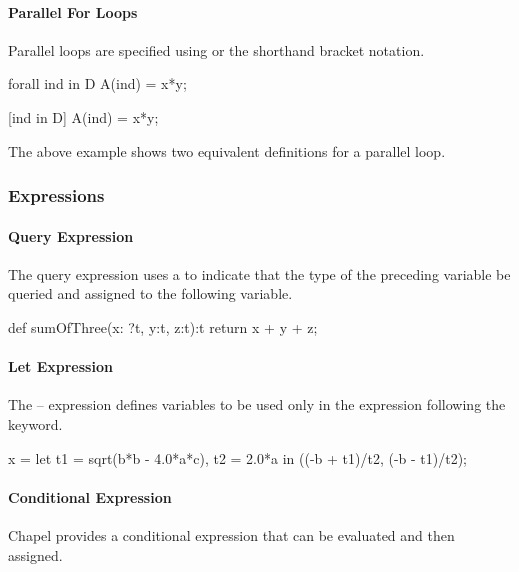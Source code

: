 \paragraph{Parallel For Loops} 
Parallel loops are specified using  or
the shorthand bracket notation.

\begin{example}
\begin{chapel}
forall ind in D {
  A(ind) = x*y;
}

[ind in D] A(ind) = x*y; 
\end{chapel}
The above example shows two equivalent definitions for a parallel
loop. 
\end{example}

\subsubsection{Expressions}
\paragraph{Query Expression} 
The query expression uses a  to indicate that the type of the
preceding variable be queried and assigned to the following variable.

\begin{example}
\begin{chapel}
def sumOfThree(x: ?t, y:t, z:t):t {
   return x + y + z;
}
\end{chapel}
\end{example}

\paragraph{Let Expression} 
The -- expression defines variables to
be used only in the expression following the  keyword.

\begin{example}
\begin{chapel}
x = let t1 = sqrt(b*b - 4.0*a*c), t2 = 2.0*a
    in ((-b + t1)/t2, (-b - t1)/t2);
\end{chapel}
\end{example}

\paragraph{Conditional Expression} 
Chapel provides a conditional expression that can be evaluated
and then assigned.

